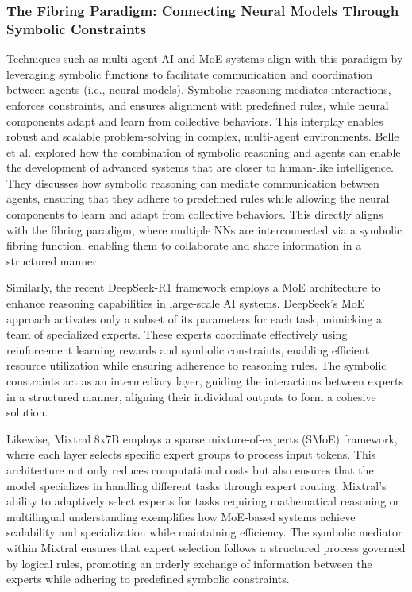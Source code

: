 \documentclass[12pt]{article}
\begin{document}
\subsubsection{The Fibring Paradigm: Connecting Neural Models Through Symbolic Constraints}
Techniques such as multi-agent AI and MoE systems align with this paradigm by leveraging symbolic functions to facilitate communication and coordination between agents (i.e., neural models). Symbolic reasoning mediates interactions, enforces constraints, and ensures alignment with predefined rules, while neural components adapt and learn from collective behaviors. This interplay enables robust and scalable problem-solving in complex, multi-agent environments. Belle et al.  \cite{belle2023neuro} explored how the combination of symbolic reasoning and agents can enable the development of advanced systems that are closer to human-like intelligence. They discusses how symbolic reasoning can mediate communication between agents, ensuring that they adhere to predefined rules while allowing the neural components to learn and adapt from collective behaviors. This directly aligns with the fibring paradigm, where multiple NNs are interconnected via a symbolic fibring function, enabling them to collaborate and share information in a structured manner.

Similarly, the recent DeepSeek-R1  \cite{guo2025deepseek} framework employs a MoE architecture to enhance reasoning capabilities in large-scale AI systems. DeepSeek’s MoE approach activates only a subset of its parameters for each task, mimicking a team of specialized experts. These experts coordinate effectively using reinforcement learning rewards and symbolic constraints, enabling efficient resource utilization while ensuring adherence to reasoning rules. The symbolic constraints act as an intermediary layer, guiding the interactions between experts in a structured manner, aligning their individual outputs to form a cohesive solution.

Likewise, Mixtral 8x7B \cite{jiang2024mixtral} employs a sparse mixture-of-experts (SMoE) framework, where each layer selects specific expert groups to process input tokens. This architecture not only reduces computational costs but also ensures that the model specializes in handling different tasks through expert routing. Mixtral’s ability to adaptively select experts for tasks requiring mathematical reasoning or multilingual understanding exemplifies how MoE-based systems achieve scalability and specialization while maintaining efficiency. The symbolic mediator within Mixtral ensures that expert selection follows a structured process governed by logical rules, promoting an orderly exchange of information between the experts while adhering to predefined symbolic constraints. 
\end{document}
